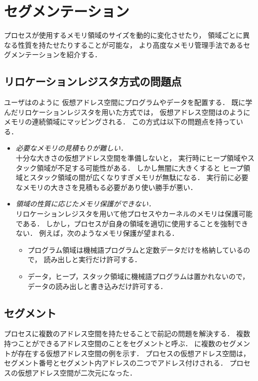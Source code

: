 \chapter{セグメンテーション}
\label{chap:segmentation}
プロセスが使用するメモリ領域のサイズを動的に変化させたり，
領域ごとに異なる性質を持たせたりすることが可能な，
より高度なメモリ管理手法であるセグメンテーションを紹介する．

\section{リロケーションレジスタ方式の問題点}
ユーザはのように
仮想アドレス空間にプログラムやデータを配置する．
既に学んだリロケーションレジスタを用いた方式では，
仮想アドレス空間はのように
メモリの連続領域にマッピングされる．
この方式は以下の問題点を持っている．

\begin{itemize}
\item \emph{必要なメモリの見積もりが難しい．} \\
  十分な大きさの仮想アドレス空間を準備しないと，
  実行時にヒープ領域やスタック領域が不足する可能性がある．
  しかし無闇に大きくすると
  ヒープ領域とスタック領域の間が広くなりすぎメモリが無駄になる．
  実行前に必要なメモリの大きさを見積もる必要があり使い勝手が悪い．
\item \emph{領域の性質に応じたメモリ保護ができない．} \\
  リロケーションレジスタを用いて他プロセスやカーネルのメモリは保護可能である．
  しかし，プロセスが自身の領域を適切に使用することを強制できない．
  例えば，次のようなメモリ保護が望まれる．
  \begin{itemize}
  \item プログラム領域は機械語プログラムと定数データだけを格納しているので，
    読み出しと実行だけ許可する．
  \item データ，ヒープ，スタック領域に機械語プログラムは置かれないので，
    データの読み出しと書き込みだけ許可する．
  \end{itemize}
\end{itemize}

\section{セグメント}
プロセスに複数のアドレス空間を持たせることで前記の問題を解決する．
複数持つことができるアドレス空間のことをセグメントと呼ぶ．
に複数のセグメントが存在する仮想アドレス空間の例を示す．
プロセスの仮想アドレス空間は，
セグメント番号とセグメント内アドレスの二つでアドレス付けされる．
プロセスの仮想アドレス空間が二次元になった．

